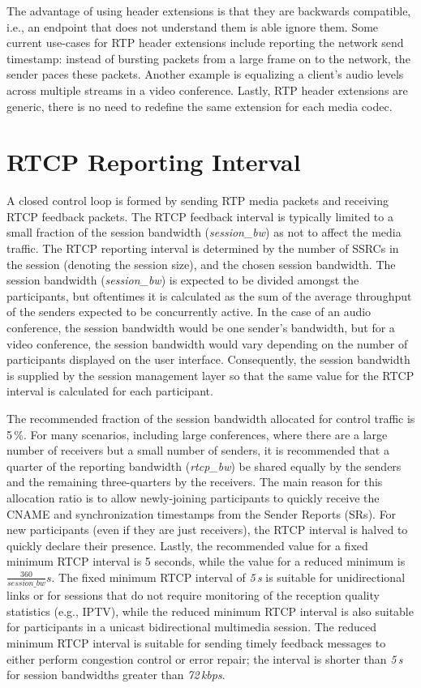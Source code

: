 The advantage of using header extensions is that they are backwards
compatible, i.e., an endpoint that does not understand them is able ignore
them. Some current use-cases for RTP header extensions include reporting the
network send timestamp: instead of bursting packets from a large frame on to
the network, the sender paces these packets.  Another example is equalizing a
client's audio levels across multiple streams in a video conference. Lastly,
RTP header extensions are generic, there is no need to redefine the same extension
for each media codec.

\section{RTCP Reporting Interval}

A closed control loop is formed by sending RTP media packets and receiving
RTCP feedback packets. The RTCP feedback interval is typically limited to a
small fraction of the session bandwidth (\emph{session\_bw}) as not to affect the media traffic.
The RTCP reporting interval is determined by the number of SSRCs in the
session (denoting the session size), and the chosen session bandwidth. The
session bandwidth (\emph{session\_bw}) is expected to be divided amongst the participants, but
oftentimes it is calculated as the sum of the average throughput of the
senders expected to be concurrently active. In the case of an audio conference,
the session bandwidth would be one sender's bandwidth, but for a video
conference, the session bandwidth would vary depending on the number of participants displayed on
the user interface. Consequently, the session bandwidth is supplied by the
session management layer so that the same value for the RTCP interval is calculated for each participant.


The recommended fraction of the session bandwidth allocated for control
traffic is 5\,\%. For many scenarios, including large conferences, where there
are a large number of receivers but a small number of senders, it is
recommended that a quarter of the reporting bandwidth (\emph{rtcp\_bw}) be
shared equally by the senders and the remaining three-quarters by the receivers. The
main reason for this allocation ratio is to allow newly-joining participants to quickly receive the
CNAME and synchronization timestamps from the Sender Reports (SRs). 
For new participants (even if they are just receivers), the RTCP
interval is halved to quickly declare their presence.  Lastly, the recommended
value for a fixed minimum RTCP interval is 5 seconds, while the value for a
reduced minimum is $\frac{360}{session\_bw}s$.  The fixed minimum RTCP
interval of \emph{5\,s} is suitable for unidirectional links or for sessions
that do not require monitoring of the reception quality statistics (e.g., IPTV),
while the reduced minimum RTCP interval is also suitable for participants in a
unicast bidirectional multimedia session. The reduced minimum RTCP interval
is suitable for sending timely feedback messages to either perform congestion
control or error repair; the interval is shorter than \emph{5\,s} for session
bandwidths greater than \emph{72\,kbps}.

